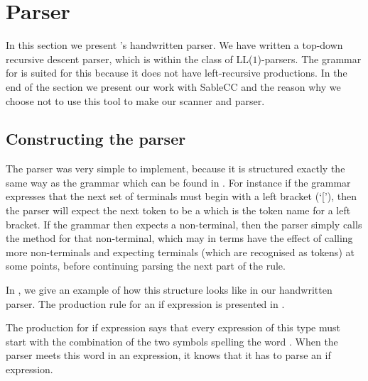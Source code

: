 \section{Parser}
\label{sec:parserimplementation}

In this section we present \productname{}'s handwritten parser. We have
written a top-down recursive descent parser, which is within the class
of LL($1$)-parsers. The grammar for \productname{} is suited for this
because it does not have left-recursive productions. In the end of
the section we present our work with SableCC and the reason why we choose
not to use this tool to make our scanner and parser.

\subsection{Constructing the parser}
The parser was very simple to implement, because it is structured exactly the same way as the
grammar which can be found in .  For instance if the grammar
expresses that the next set of terminals must begin with a left bracket (`['),
  then the parser will expect the next token to be a  which
  is the token name for a left bracket. If the grammar then expects a
  non-terminal, then the parser simply calls the method for that non-terminal,
  which may in terms have the effect of calling more non-terminals and expecting terminals (which are recognised as tokens) at some points, 
  before continuing parsing the next part of the rule.

In , we give an example of how this structure looks like in
our handwritten parser. The production rule for an if expression is presented in
.


The production for if expression says that every expression of this type
must start with the combination of the two symbols spelling the word
. When the parser meets this word in an expression, it knows
that it has to parse an if expression.



